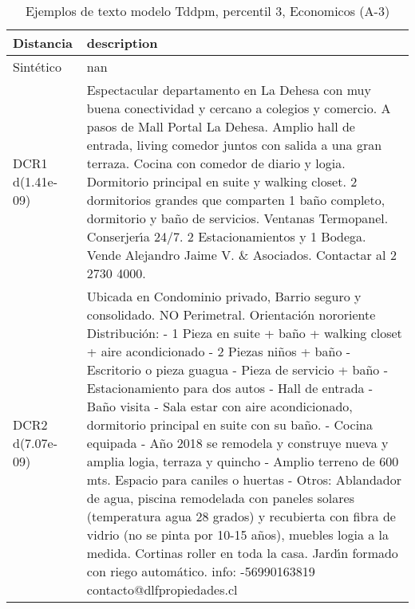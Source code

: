 \begin{table}[H]
\centering
\fontsize{10}{14}\selectfont
\caption{Ejemplos de texto modelo Tddpm, percentil 3, Economicos (A-3)}
\label{table-example-economicos-a-3-tddpm_mlp-3p-text}
\begin{tabular}{|l|m{35em}|}
\hline
\rowcolor[gray]{0.8}
Distancia & description \\
\hline Sintético & nan \\
\hline DCR1 d(1.41e-09) & Espectacular departamento en La Dehesa con muy buena conectividad y cercano a colegios y comercio.
 A pasos de Mall Portal La Dehesa.  Amplio hall de entrada, living comedor juntos con salida a una gran terraza. Cocina con comedor de diario y logia.
 Dormitorio principal en suite y walking closet. 2 dormitorios grandes que comparten 1 ba\~no completo, dormitorio y ba\~no de servicios. Ventanas Termopanel. Conserjer{\'\i}a 24/7.  2 Estacionamientos y 1 Bodega. Vende Alejandro Jaime V. \& Asociados. Contactar al 2 2730 4000. \\
\hline DCR2 d(7.07e-09) & Ubicada en Condominio privado, Barrio seguro y consolidado. NO Perimetral.  Orientaci\'on nororiente Distribuci\'on: - 1 Pieza en suite + ba\~no + walking closet + aire acondicionado - 2 Piezas ni\~nos + ba\~no - Escritorio o pieza guagua - Pieza de servicio + ba\~no - Estacionamiento para dos autos - Hall de entrada - Ba\~no visita - Sala estar con aire acondicionado, dormitorio principal en suite con su ba\~no. - Cocina equipada - A\~no 2018 se remodela y construye nueva y amplia logia, terraza y quincho - Amplio terreno de 600 mts. Espacio para caniles o huertas - Otros: Ablandador de agua, piscina remodelada con paneles solares (temperatura agua 28 grados) y recubierta con fibra de vidrio (no se pinta por 10-15 a\~nos), muebles logia a la medida. Cortinas roller en toda la casa. Jard{\'\i}n formado con riego autom\'atico.  info: -56990163819 contacto@dlfpropiedades.cl \\
\hline
\end{tabular}
\end{table}
